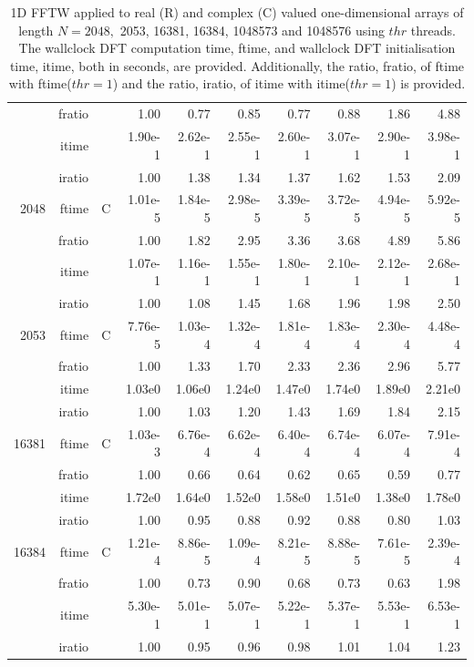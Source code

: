 \documentclass[a4paper]{article}
\begin{document}
\begin{table}[!htbp]
\begin{center}
\begin{small}
\begin{tabular}{|r|r|r|r|r|r|r|r|r|r|}
      & fratio & & 1.00 &   0.77 &   0.85 &   0.77 &   0.88 &   1.86 &   4.88  \\
     & itime & & 1.90e-1 &   2.62e-1 &   2.55e-1 &   2.60e-1 &   3.07e-1 &   2.90e-1 &   3.98e-1   \\ 
 & iratio & & 1.00 &   1.38 &   1.34 &   1.37 &   1.62 &   1.53 &   2.09   \\  \hline \hline
    2048  & ftime & C  &  1.01e-5 &   1.84e-5 &   2.98e-5 &   3.39e-5 &   3.72e-5 &   4.94e-5 &   5.92e-5   \\ 
      & fratio & &  1.00 &   1.82 &   2.95 &   3.36 &   3.68 &   4.89 &   5.86  \\ 
     & itime & &   1.07e-1 &   1.16e-1 &   1.55e-1 &   1.80e-1 &   2.10e-1 &   2.12e-1 &   2.68e-1   \\ 
     & iratio & &  1.00 &   1.08 &   1.45 &   1.68 &   1.96 &   1.98 &   2.50     \\ \hline 
    2053  & ftime & C &  7.76e-5 &   1.03e-4 &   1.32e-4 &   1.81e-4 &   1.83e-4 &   2.30e-4 &   4.48e-4     \\ 
      & fratio & &  1.00 &   1.33 &   1.70 &   2.33 &   2.36 &   2.96 &   5.77   \\ 
     & itime &  &  1.03e0 &   1.06e0 &   1.24e0 &   1.47e0 &   1.74e0 &   1.89e0 &   2.21e0    \\ 
    & iratio &  &  1.00 &   1.03 &   1.20 &   1.43 &   1.69 &   1.84 &   2.15       \\ \hline
  16381  & ftime & C &   1.03e-3 &   6.76e-4 &   6.62e-4 &   6.40e-4 &   6.74e-4 &   6.07e-4 &   7.91e-4     \\ 
      & fratio & &  1.00 &   0.66 &  0.64 &   0.62 &  0.65 &   0.59 &  0.77   \\ 
     & itime & &   1.72e0 &   1.64e0 &   1.52e0 &   1.58e0 &   1.51e0 &   1.38e0 &   1.78e0    \\ 
     & iratio & &   1.00 &   0.95 &  0.88 &  0.92 &  0.88 &  0.80 &  1.03    \\ \hline
 16384  & ftime & C &  1.21e-4 &   8.86e-5 &   1.09e-4 &   8.21e-5 &   8.88e-5 &   7.61e-5 &   2.39e-4  \\ 
      & fratio & & 1.00 &   0.73 &  0.90 &  0.68 &  0.73 &  0.63 &  1.98  \\
     & itime & &  5.30e-1 &   5.01e-1 &   5.07e-1 &   5.22e-1 &   5.37e-1 &   5.53e-1 &   6.53e-1   \\ 
 & iratio & &  1.00 &   0.95 &  0.96 &  0.98 &  1.01 &   1.04 &   1.23  \\  \hline 
\end{tabular}
\caption{1D FFTW applied to real (R) and complex (C) valued one-dimensional arrays of length $N=2048,$ 2053, 16381, 16384, 1048573 and 1048576 using $thr$ threads. The wallclock DFT computation time, ftime, and wallclock DFT initialisation time, itime, both in seconds, are provided. Additionally,  the ratio, fratio, of ftime  with ftime($thr=1$) and the ratio, iratio, of itime  with itime($thr=1$) is provided. }\label{Tbl:FFTW1d}
\end{small}
\end{center}
\end{table}
\end{document}
